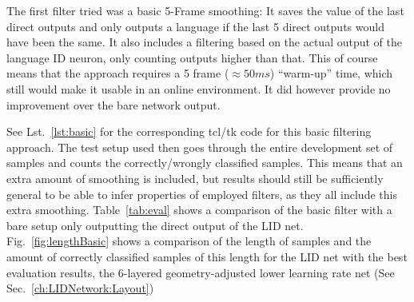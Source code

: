 The first filter tried was a basic 5-Frame smoothing: It saves the value of the last direct outputs and only outputs a language if the last 5 direct outputs would have been the same. It also includes a filtering based on the actual output of the language ID neuron, only counting outputs higher than that. This of course means that the approach requires a 5 frame (\(\approx 50 ms\)) ``warm-up'' time, which still would make it usable in an online environment. It did however provide no improvement over the bare network output.

See Lst.~\ref{lst:basic} for the corresponding tcl/tk code for this basic filtering approach. The test setup used then goes through the entire development set of samples and counts the correctly/wrongly classified samples. This means that an extra amount of smoothing is included, but results should still be sufficiently general to be able to infer properties of employed filters, as they all include this extra smoothing. Table~\ref{tab:eval} shows a comparison of the basic filter with a bare setup only outputting the direct output of the LID net. Fig.~\ref{fig:lengthBasic} shows a comparison of the length of samples and the amount of correctly classified samples of this length for the LID net with the best evaluation results, the 6-layered geometry-adjusted lower learning rate net (See Sec.~\ref{ch:LIDNetwork:Layout}) 

